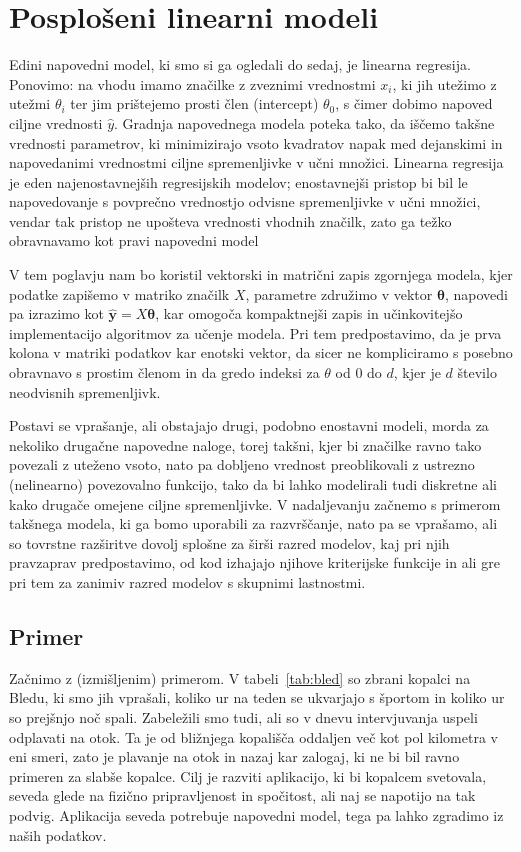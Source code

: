 \chapter{Posplošeni linearni modeli}

Edini napovedni model, ki smo si ga ogledali do sedaj, je linearna regresija. Ponovimo: na vhodu imamo značilke z zveznimi vrednostmi $x_i$, ki jih utežimo z utežmi $\theta_i$ ter jim prištejemo prosti člen (intercept) $\theta_0$, s čimer dobimo napoved ciljne vrednosti $\hat{y}$. Gradnja napovednega modela poteka tako, da iščemo takšne vrednosti parametrov, ki minimizirajo vsoto kvadratov napak med dejanskimi in napovedanimi vrednostmi ciljne spremenljivke v učni množici. Linearna regresija je eden najenostavnejših regresijskih modelov; enostavnejši pristop bi bil le napovedovanje s povprečno vrednostjo odvisne spremenljivke v učni množici, vendar tak pristop ne upošteva vrednosti vhodnih značilk, zato ga težko obravnavamo kot pravi napovedni model

V tem poglavju nam bo koristil vektorski in matrični zapis zgornjega modela, kjer podatke zapišemo v matriko značilk $X$, parametre združimo v vektor $\boldsymbol{\theta}$, napovedi pa izrazimo kot $\hat{\mathbf{y}} = X \boldsymbol{\theta}$, kar omogoča kompaktnejši zapis in učinkovitejšo implementacijo algoritmov za učenje modela. Pri tem predpostavimo, da je prva kolona v matriki podatkov kar enotski vektor, da sicer ne kompliciramo s posebno obravnavo s prostim členom in da gredo indeksi za $\theta$ od $0$ do $d$, kjer je $d$ število neodvisnih spremenljivk.

Postavi se vprašanje, ali obstajajo drugi, podobno enostavni modeli, morda za nekoliko drugačne napovedne naloge, torej takšni, kjer bi značilke ravno tako povezali z uteženo vsoto, nato pa dobljeno vrednost preoblikovali z ustrezno (nelinearno) povezovalno funkcijo, tako da bi lahko modelirali tudi diskretne ali kako drugače omejene ciljne spremenljivke. V nadaljevanju začnemo s primerom takšnega modela, ki ga bomo uporabili za razvrščanje, nato pa se vprašamo, ali so tovrstne razširitve dovolj splošne za širši razred modelov, kaj pri njih pravzaprav predpostavimo, od kod izhajajo njihove kriterijske funkcije in ali gre pri tem za zanimiv razred modelov s skupnimi lastnostmi.

\section{Primer}

Začnimo z (izmišljenim) primerom. V tabeli~\ref{tab:bled} so zbrani kopalci na Bledu, ki smo jih vprašali, koliko ur na teden se ukvarjajo s športom in koliko ur so prejšnjo noč spali. Zabeležili smo tudi, ali so v dnevu intervjuvanja uspeli odplavati na otok. Ta je od bližnjega kopališča oddaljen več kot pol kilometra v eni smeri, zato je plavanje na otok in nazaj kar zalogaj, ki ne bi bil ravno primeren za slabše kopalce. Cilj je razviti aplikacijo, ki bi kopalcem svetovala, seveda glede na fizično pripravljenost in spočitost, ali naj se napotijo na tak podvig. Aplikacija seveda potrebuje napovedni model, tega pa lahko zgradimo iz naših podatkov.



